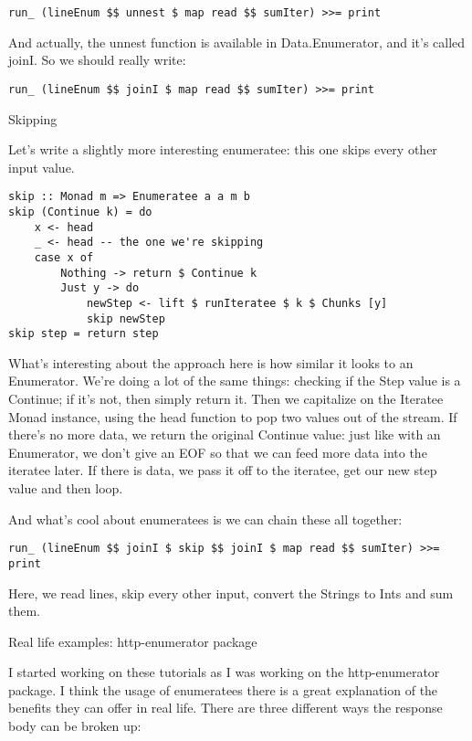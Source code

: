 \begin{lstlisting}
run_ (lineEnum $$ unnest $ map read $$ sumIter) >>= print
\end{lstlisting}

And actually, the unnest function is available in Data.Enumerator, and it's called joinI. So we should really write:

\begin{lstlisting}
run_ (lineEnum $$ joinI $ map read $$ sumIter) >>= print
\end{lstlisting}

Skipping

Let's write a slightly more interesting enumeratee: this one skips every other input value.

\begin{lstlisting}
skip :: Monad m => Enumeratee a a m b
skip (Continue k) = do
    x <- head
    _ <- head -- the one we're skipping
    case x of
        Nothing -> return $ Continue k
        Just y -> do
            newStep <- lift $ runIteratee $ k $ Chunks [y]
            skip newStep
skip step = return step
\end{lstlisting}

What's interesting about the approach here is how similar it looks to an Enumerator. We're doing a lot of the same things: checking if the Step value is a Continue; if it's not, then simply return it. Then we capitalize on the Iteratee Monad instance, using the head function to pop two values out of the stream. If there's no more data, we return the original Continue value: just like with an Enumerator, we don't give an EOF so that we can feed more data into the iteratee later. If there is data, we pass it off to the iteratee, get our new step value and then loop.

And what's cool about enumeratees is we can chain these all together:

\begin{lstlisting}
run_ (lineEnum $$ joinI $ skip $$ joinI $ map read $$ sumIter) >>= print
\end{lstlisting}

Here, we read lines, skip every other input, convert the Strings to Ints and sum them.

Real life examples: http-enumerator package

I started working on these tutorials as I was working on the http-enumerator package. I think the usage of enumeratees there is a great explanation of the benefits they can offer in real life. There are three different ways the response body can be broken up:

